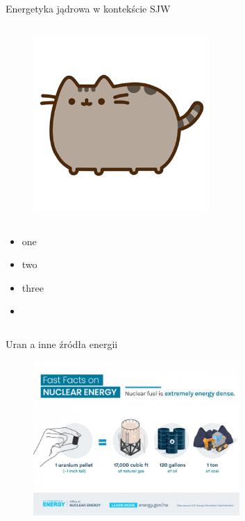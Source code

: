 \begin{columnframe}{Energetyka jądrowa w kontekście SJW}
    \begin{column}{0.5\textwidth}
        \begin{figure}
            \centering
            \includegraphics[width=0.6\textwidth, frame]{images/pusheen.png}
        \end{figure}
    \end{column}
    \begin{column}{0.5\textwidth}
        \begin{itemize}
            \item one \keV
            \item two \MeV
            \item three \GeV
            \item \aegis
        \end{itemize}
    \end{column}
\end{columnframe}

\begin{frame}{Uran a inne źródła energii}
    \begin{figure}
        \centering
        \includegraphics[width=0.7\textwidth, frame]{images/doe_uranium_propaganda.jpg}
    \end{figure}
\end{frame}


